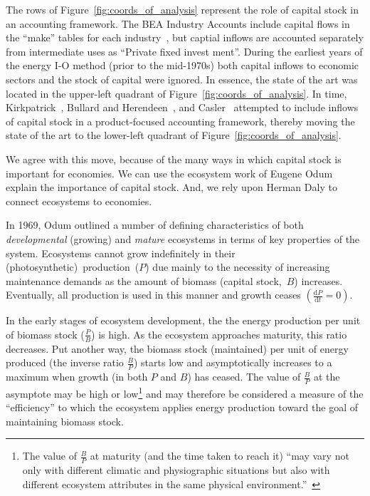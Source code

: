 The rows of Figure~\ref{fig:coords_of_analysis}
represent the role of capital stock in an accounting framework.
The BEA Industry Accounts include capital flows in the ``make''
tables for each industry~\cite[Table~1]{Streitwieser:2011aa}, 
but captial inflows are accounted separately 
from intermediate uses as 
``Private fixed invest­ ment''.\cite[Table~2]{Streitwieser:2011aa}
During the earliest years of the energy I-O method 
(prior to the mid-1970s) 
both capital inflows to economic sectors 
and the stock of capital were ignored.
In essence, the state of the art was located in the upper-left quadrant
of Figure~\ref{fig:coords_of_analysis}.
In time, Kirkpatrick~\cite{Kirkpatrick:1974te}, 
Bullard and Herendeen~\cite{Bullard-III:1975aa},
and Casler~\cite{Casler:1983uy} attempted to 
include inflows of capital stock in a product-focused
accounting framework, thereby moving the state of the art 
to the lower-left quadrant of Figure~\ref{fig:coords_of_analysis}.

We agree with this move, because of the many ways in which
capital stock is important for economies.
We can use the ecosystem work of Eugene Odum 
explain the importance of capital stock.
And, we rely upon Herman Daly to connect
ecosystems to economies.

In 1969, Odum outlined a number of 
defining characteristics of both \emph{developmental}
(growing) and \emph{mature} ecosystems in terms of key
properties of the system.\cite{Odum1969}
Ecosystems cannot
grow indefinitely in their (photosynthetic)~production~($P$)
due mainly to the necessity of increasing maintenance
demands as the amount of biomass (capital
stock,~$B$) increases.
Eventually, all production is used in this manner
and growth ceases 
$\left(\frac{\mathrm{d}P}{\mathrm{d}t} = 0\right)$.

In the early stages of ecosystem development,
the the energy production per unit of biomass stock ($\frac{P}{B}$)
is high.
As the ecosystem approaches maturity,
this ratio decreases.
Put another way,
the biomass stock (maintained) per unit of energy produced
(the inverse ratio $\frac{B}{P}$)
starts low and asymptotically increases to a maximum
when growth (in both $P$ and $B$) has ceased. 
The value of $\frac{B}{P}$ at the asymptote may be high or low\footnote{The
	value of $\frac{B}{P}$ at maturity (and the time taken to reach it)
	``may vary not only with different climatic 
	and physiographic situations but also with
	different ecosystem attributes in the same physical 
	environment.''~\cite[p.263]{Odum1969}}
and may therefore be considered a measure of 
the ``efficiency'' to which the ecosystem applies
energy production toward
the goal of maintaining biomass stock.
 
